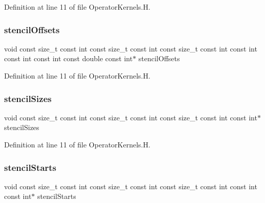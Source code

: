 Definition at line 11 of file Operator\+Kernels.\+H.

\hypertarget{OperatorKernels_8H_aace4e878476c6638c99ce2be58848e52}{}\label{OperatorKernels_8H_aace4e878476c6638c99ce2be58848e52} 
\subsubsection{\texorpdfstring{stencil\+Offsets}{stencilOffsets}}
{\footnotesize\ttfamily void const size\+\_\+t const int const size\+\_\+t const int const size\+\_\+t const int const int const int const int const double const int$\ast$ stencil\+Offsets}



Definition at line 11 of file Operator\+Kernels.\+H.

\hypertarget{OperatorKernels_8H_ad36f7e6638c24dc8cce030ebb48e32a4}{}\label{OperatorKernels_8H_ad36f7e6638c24dc8cce030ebb48e32a4} 
\subsubsection{\texorpdfstring{stencil\+Sizes}{stencilSizes}}
{\footnotesize\ttfamily void const size\+\_\+t const int const size\+\_\+t const int const size\+\_\+t const int const int$\ast$ stencil\+Sizes}



Definition at line 11 of file Operator\+Kernels.\+H.

\hypertarget{OperatorKernels_8H_ab81c9b92fc99d6a20e08f1ad1c9630b0}{}\label{OperatorKernels_8H_ab81c9b92fc99d6a20e08f1ad1c9630b0} 
\subsubsection{\texorpdfstring{stencil\+Starts}{stencilStarts}}
{\footnotesize\ttfamily void const size\+\_\+t const int const size\+\_\+t const int const size\+\_\+t const int const int const int$\ast$ stencil\+Starts}



